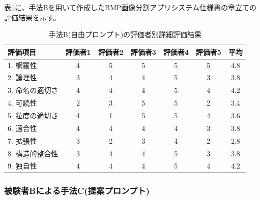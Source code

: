 表\ref{tb:detailed_evaluation_results_B}に、手法Bを用いて作成したBMP画像分割アプリシステム仕様書の章立ての評価結果を示す。

\begin{table}[tp]
  \caption{手法B(自由プロンプト)の評価者別詳細評価結果}
  \label{tb:detailed_evaluation_results_B}
  \centering
  \begin{tabular}{|l|c|c|c|c|c|c|}
    \hline
    \textbf{評価項目} & \textbf{評価者1} & \textbf{評価者2} & \textbf{評価者3} & \textbf{評価者4} & \textbf{評価者5} & \textbf{平均} \\
    \hline\hline
    1. 網羅性 & 4 & 5 & 5 & 5 & 5 & 4.8 \\
    \hline
    2. 論理性 & 3 & 4 & 4 & 5 & 3 & 3.8 \\
    \hline
    3. 命名の適切さ & 4 & 4 & 4 & 5 & 4 & 4.2 \\
    \hline
    4. 可読性 & 2 & 3 & 5 & 5 & 2 & 3.4 \\
    \hline
    5. 粒度の適切さ & 4 & 1 & 5 & 5 & 4 & 3.6 \\
    \hline
    6. 適合性 & 4 & 4 & 4 & 4 & 3 & 3.8 \\
    \hline
    7. 拡張性 & 3 & 2 & 3 & 4 & 2 & 2.8 \\
    \hline
    8. 構造的整合性 & 3 & 4 & 4 & 5 & 3 & 3.8 \\
    \hline
    9. 独自性 & 4 & 4 & 4 & 5 & 4 & 4.2 \\
    \hline
  \end{tabular}
\end{table}





\subsubsection{被験者Bによる手法C(提案プロンプト)}

